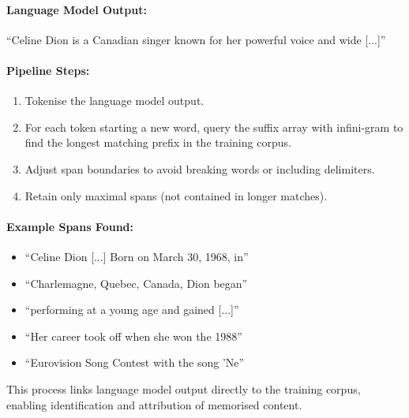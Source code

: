 \begin{examplebox}
\label{ex:olmotrace-pipeline}

\paragraph{Language Model Output:} ``Celine Dion is a Canadian singer known for her powerful voice and wide [...]''\\

\paragraph{Pipeline Steps:}
\begin{enumerate}
    \item Tokenise the language model output.
    \item For each token starting a new word, query the suffix array with infini-gram to find the longest matching prefix in the training corpus.
    \item Adjust span boundaries to avoid breaking words or including delimiters.
    \item Retain only maximal spans (not contained in longer matches).
\end{enumerate}

\paragraph{Example Spans Found:}
\begin{itemize}
    \item ``Celine Dion [...] Born on March 30, 1968, in''
    \item ``Charlemagne, Quebec, Canada, Dion began''
    \item ``performing at a young age and gained [...]''
    \item ``Her career took off when she won the 1988''
    \item ``Eurovision Song Contest with the song 'Ne''
\end{itemize}

This process links language model output directly to the training corpus, enabling identification and attribution of memorised content.
\end{examplebox}

